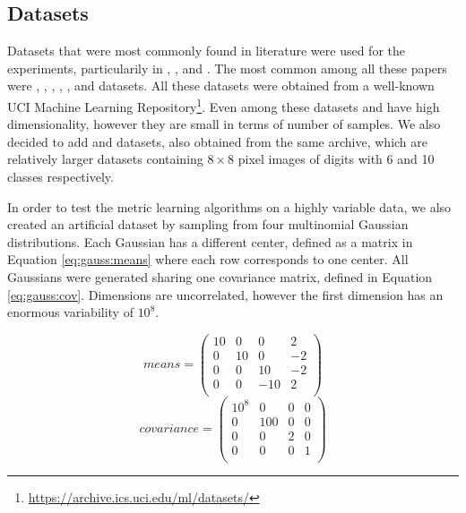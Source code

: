 \documentclass[12pt,a4paper]{report}
\begin{document}
\subsection{Datasets} \label{chap:exp:datasets}
Datasets that were most commonly found in literature were used for the experiments, particularily in \citep{xing2002distance}, \citep{weinberger2009distance}, \citep{jacobgoldberger2004neighbourhood} and \citep{fukui2013evolutionary}. The most common among all these papers were , , , , ,  and  datasets. All these datasets were obtained from a well-known UCI Machine Learning Repository\footnote{\url{https://archive.ics.uci.edu/ml/datasets/}}. Even among these datasets  and  have high dimensionality, however they are small in terms of number of samples. We also decided to add  and  datasets, also obtained from the same archive, which are relatively larger datasets containing $8\times 8$ pixel images of digits with 6 and 10 classes respectively.

In order to test the metric learning algorithms on a highly variable data, we also created an artificial dataset  by sampling from four multinomial Gaussian distributions. Each Gaussian has a different center, defined as a matrix in Equation \ref{eq:gauss:means} where each row corresponds to one center. All Gaussians were generated sharing one covariance matrix, defined in Equation \ref{eq:gauss:cov}. Dimensions are uncorrelated, however the first dimension has an enormous variability of $10^8$.

\begin{equation} \label{eq:gauss:means}
means = \begin{pmatrix}
10 & 0 & 0 & 2 \\
0 & 10 & 0 & -2 \\
0 & 0 & 10 & -2 \\
0 & 0 & -10 & 2 \\
\end{pmatrix}
\end{equation}
\begin{equation} \label{eq:gauss:cov}
covariance = \begin{pmatrix}
10^8 & 0 & 0 & 0 \\
0 & 100 & 0 & 0 \\
0 & 0 & 2 & 0 \\
0 & 0 & 0 & 1 \\
\end{pmatrix}
\end{equation}
\end{document}
